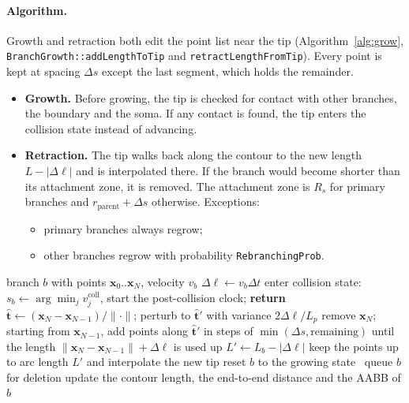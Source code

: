 \documentclass[11pt,a4paper]{article}
\newcommand{\code}[1]{\texttt{#1}}
\newcommand{\vect}[1]{\bm{#1}}
\begin{document}
\paragraph{Algorithm.}
Growth and retraction both edit the point list near the tip (Algorithm~\ref{alg:grow}, \code{BranchGrowth::\allowbreak addLengthToTip} and \code{retractLengthFromTip}). Every point is kept at spacing $\Delta s$ except the last segment, which holds the remainder.
\begin{itemize}
  \item \textbf{Growth.} Before growing, the tip is checked for contact with other branches, the boundary and the soma. If any contact is found, the tip enters the collision state instead of advancing.
  \item \textbf{Retraction.} The tip walks back along the contour to the new length $L-|\Delta\ell|$ and is interpolated there. If the branch would become shorter than its attachment zone, it is removed. The attachment zone is $R_s$ for primary branches and $r_\text{parent}+\Delta s$ otherwise. Exceptions:
  \begin{itemize}
    \item primary branches always regrow;
    \item other branches regrow with probability \code{RebranchingProb}.
  \end{itemize}
\end{itemize}

\begin{algorithm}[!htbp]
\caption{Tip elongation and retraction (\code{BranchGrowth::updateGrowth})}\label{alg:grow}
\begin{algorithmic}[1]
\Require branch $b$ with points $\vect x_0..\vect x_N$, velocity $v_b$
\State $\Delta\ell\gets v_b\Delta t$
   \State enter collision state: $s_b\gets\arg\min_j v^\text{coll}_j$, start the post-collision clock; \textbf{return}\EndIf
  \State $\hat{\vect t}\gets(\vect x_N-\vect x_{N-1})/\lVert\cdot\rVert$; perturb to $\hat{\vect t}'$ with variance $2\Delta\ell/L_p$
  \State remove $\vect x_N$; starting from $\vect x_{N-1}$, add points along $\hat{\vect t}'$ in steps of $\min(\Delta s,\text{remaining})$ until the length $\lVert\vect x_N-\vect x_{N-1}\rVert+\Delta\ell$ is used up
  \State $L'\gets L_b-|\Delta\ell|$
   keep the points up to arc length $L'$ and interpolate the new tip
   reset $b$ to the growing state
  \Else\ queue $b$ for deletion
  \EndIf
\EndIf
\State update the contour length, the end-to-end distance and the AABB of $b$
\end{algorithmic}
\end{algorithm}
\end{document}

